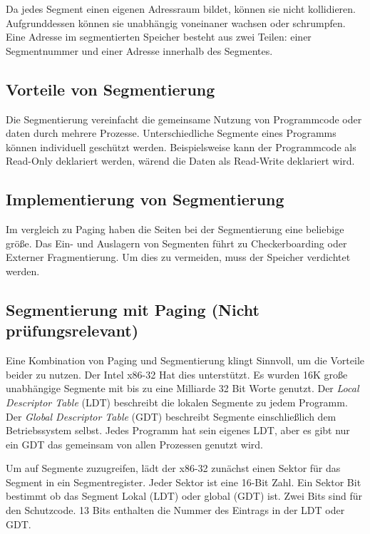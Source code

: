 Da jedes Segment einen eigenen Adressraum bildet, können sie nicht ko\-lli\-die\-ren. Aufgrunddessen können sie unabhängig voneinaner wachsen oder schrumpfen. Eine Adresse im segmentierten Speicher besteht aus zwei Teilen: einer Seg\-ment\-nummer und einer Adresse innerhalb des Segmentes.

\subsection{Vorteile von Segmentierung}

Die Segmentierung vereinfacht die gemeinsame Nutzung von Programmcode oder daten durch mehrere Prozesse. Unterschiedliche Segmente eines Pro\-gramms können individuell geschützt werden. Beispielsweise kann der Pro\-gramm\-code als Read-Only deklariert werden, wärend die Daten als Read-Write deklariert wird.

\subsection{Implementierung von Segmentierung}

Im vergleich zu Paging haben die Seiten bei der Segmentierung eine beliebige größe. Das Ein- und Auslagern von Segmenten führt zu Checkerboarding oder Externer Fragmentierung. Um dies zu vermeiden, muss der Speicher verdichtet werden.

\subsection{Segmentierung mit Paging (Nicht prüfungsrelevant)}

Eine Kombination von Paging und Segmentierung klingt Sinnvoll, um die Vorteile beider zu nutzen. Der Intel x86-32 Hat dies unterstützt. Es wurden 16K große unabhängige Segmente mit bis zu eine Milliarde 32 Bit Worte genutzt. Der \textit{Local Descriptor Table} (LDT) beschreibt die lokalen Segmente zu jedem Programm. Der \textit{Global Descriptor Table} (GDT) beschreibt Segmente einschließlich dem Betriebssystem selbst. Jedes Programm hat sein eigenes LDT, aber es gibt nur ein GDT das gemeinsam von allen Prozessen genutzt wird.

Um auf Segmente zuzugreifen, lädt der x86-32 zunächst einen Sektor für das Segment in ein Segmentregister. Jeder Sektor ist eine 16-Bit Zahl. Ein Sektor Bit bestimmt ob das Segment Lokal (LDT) oder global (GDT) ist. Zwei Bits sind für den Schutzcode. 13 Bits enthalten die Nummer des Eintrags in der LDT oder GDT.

